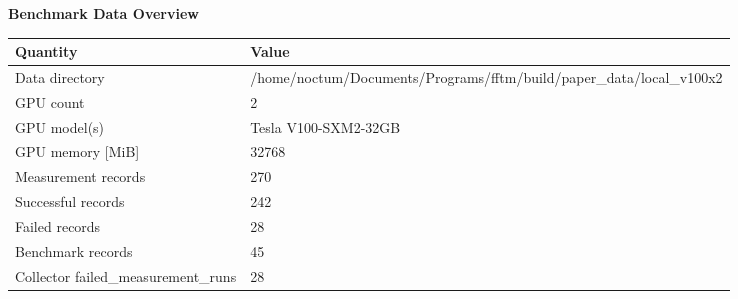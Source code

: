 \documentclass{article}
\begin{document}
\begin{center}
{\fontsize{8.0pt}{9.4pt}\selectfont
\textbf{Benchmark Data Overview}

\vspace{0.6em}
\begin{tabular}{ll}
\hline
Quantity & Value \\
\hline
Data directory & /home/noctum/Documents/Programs/fftm/build/paper\_data/local\_v100x2 \\
GPU count & 2 \\
GPU model(s) & Tesla V100-SXM2-32GB \\
GPU memory [MiB] & 32768 \\
Measurement records & 270 \\
Successful records & 242 \\
Failed records & 28 \\
Benchmark records & 45 \\
Collector failed\_measurement\_runs & 28 \\
\hline
\end{tabular}
}
\end{center}
\end{document}
